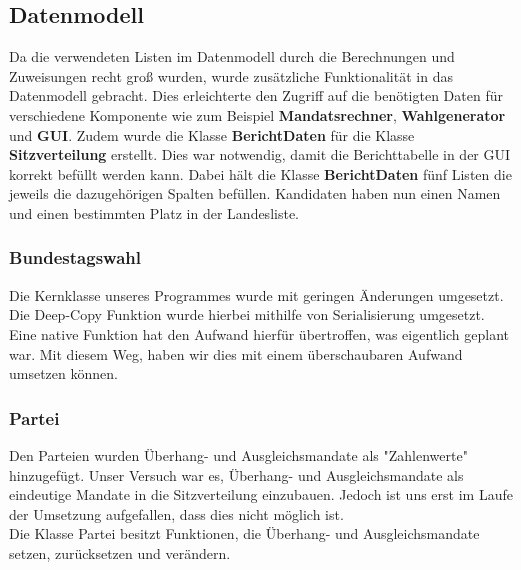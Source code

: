 \documentclass[12pt,a4paper,titlepage]{article}
\newcommand{\myma}{\fontfamily{pcr}\selectfont \textbf}
\begin{document}
\subsection{Datenmodell}
Da die verwendeten Listen im Datenmodell durch die Berechnungen und Zuweisungen recht groß wurden, wurde zusätzliche Funktionalität in das Datenmodell gebracht. Dies erleichterte den Zugriff auf die benötigten Daten für verschiedene Komponente wie zum Beispiel {\myma{Mandatsrechner}}, {\myma{Wahlgenerator}} und {\myma{GUI}}.
Zudem wurde die Klasse {\myma{BerichtDaten}} für die Klasse {\myma{Sitzverteilung}} erstellt. Dies war notwendig, damit die Berichttabelle in der GUI korrekt befüllt werden kann. Dabei hält die Klasse {\myma{BerichtDaten}} fünf Listen die jeweils die dazugehörigen Spalten befüllen. 
Kandidaten haben nun einen Namen und einen bestimmten Platz in der Landesliste.
\subsubsection{Bundestagswahl}
Die Kernklasse unseres Programmes wurde mit geringen Änderungen umgesetzt. Die Deep-Copy Funktion wurde hierbei mithilfe von Serialisierung umgesetzt. Eine native Funktion hat den Aufwand hierfür übertroffen, was eigentlich geplant war. Mit diesem Weg, haben wir dies mit einem überschaubaren Aufwand umsetzen können.

\subsubsection{Partei}
Den Parteien wurden Überhang- und Ausgleichsmandate als "Zahlenwerte" hinzugefügt. Unser Versuch war es, Überhang- und Ausgleichsmandate als eindeutige Mandate in die Sitzverteilung einzubauen. Jedoch ist uns erst im Laufe der Umsetzung aufgefallen, dass dies nicht möglich ist. \\
Die Klasse Partei besitzt Funktionen, die Überhang- und Ausgleichsmandate setzen, zurücksetzen und verändern.
\end{document}

